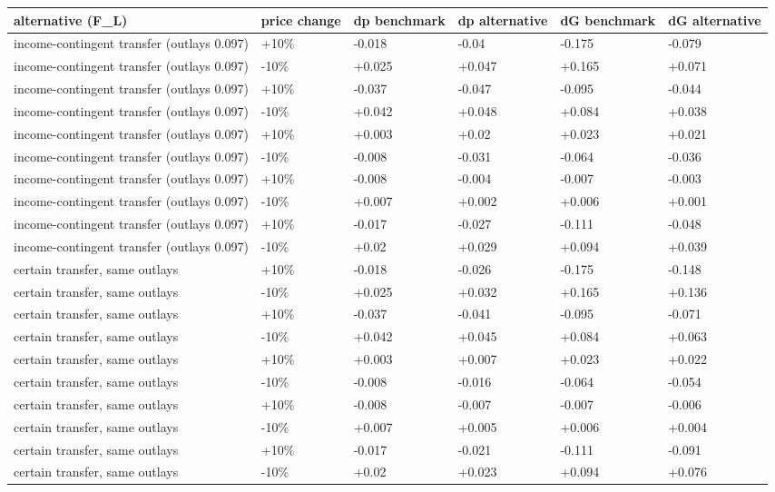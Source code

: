 \begingroup\small
\setlength{\tabcolsep}{3pt}
\renewcommand{\arraystretch}{1.04}
\begin{tabularx}{\linewidth}{XXXXXX}
\toprule
alternative (F\_L) & price change & dp benchmark & dp alternative & dG benchmark & dG alternative \\
\midrule
income-contingent transfer (outlays 0.097) & +10\% & -0.018 & -0.04 & -0.175 & -0.079 \\
income-contingent transfer (outlays 0.097) & -10\% & +0.025 & +0.047 & +0.165 & +0.071 \\
income-contingent transfer (outlays 0.097) & +10\% & -0.037 & -0.047 & -0.095 & -0.044 \\
income-contingent transfer (outlays 0.097) & -10\% & +0.042 & +0.048 & +0.084 & +0.038 \\
income-contingent transfer (outlays 0.097) & +10\% & +0.003 & +0.02 & +0.023 & +0.021 \\
income-contingent transfer (outlays 0.097) & -10\% & -0.008 & -0.031 & -0.064 & -0.036 \\
income-contingent transfer (outlays 0.097) & +10\% & -0.008 & -0.004 & -0.007 & -0.003 \\
income-contingent transfer (outlays 0.097) & -10\% & +0.007 & +0.002 & +0.006 & +0.001 \\
income-contingent transfer (outlays 0.097) & +10\% & -0.017 & -0.027 & -0.111 & -0.048 \\
income-contingent transfer (outlays 0.097) & -10\% & +0.02 & +0.029 & +0.094 & +0.039 \\
certain transfer, same outlays & +10\% & -0.018 & -0.026 & -0.175 & -0.148 \\
certain transfer, same outlays & -10\% & +0.025 & +0.032 & +0.165 & +0.136 \\
certain transfer, same outlays & +10\% & -0.037 & -0.041 & -0.095 & -0.071 \\
certain transfer, same outlays & -10\% & +0.042 & +0.045 & +0.084 & +0.063 \\
certain transfer, same outlays & +10\% & +0.003 & +0.007 & +0.023 & +0.022 \\
certain transfer, same outlays & -10\% & -0.008 & -0.016 & -0.064 & -0.054 \\
certain transfer, same outlays & +10\% & -0.008 & -0.007 & -0.007 & -0.006 \\
certain transfer, same outlays & -10\% & +0.007 & +0.005 & +0.006 & +0.004 \\
certain transfer, same outlays & +10\% & -0.017 & -0.021 & -0.111 & -0.091 \\
certain transfer, same outlays & -10\% & +0.02 & +0.023 & +0.094 & +0.076 \\
\bottomrule
\end{tabularx}
\endgroup

